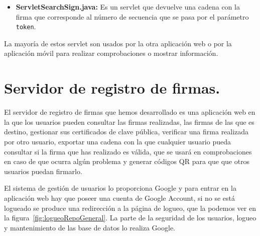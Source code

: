 \begin{itemize}
\begin{lstlisting}[style=Java]
PrintWriter pw = resp.getWriter();
pw.print("<!DOCTYPE html>");
pw.print("<html><head><title>Lista Time Stamp</title><link rel=\"stylesheet\" type=\"text/css\" " + "href=\"css/main.css\"/> <meta charset=\"utf-8\"> </head>");
pw.print("<body><table><tr><th>ID</th><th>Num sec</th><th>Firma</th><th>Date</th></tr><tr> " + "<td>"+ row.getId() +"</td><td>"+ row.getNum_sec() +"</td><td>"+ row.getFirma() +"</td><td>" +	row.getFecha() + "</td></tr> </table></body>");
pw.flush();
\end{lstlisting}

Como se puede ver se crea una tabla en una web, con la etiqueta \lstinline{<TABLE>} y su fila se rellena dinámicamente dependiendo del número de secuencia que se le pase como parámetro.

\item \textbf{ServletSearchSign.java:} Es un servlet que devuelve una cadena con la firma que corresponde al número de secuencia que se pasa por el parámetro \lstinline{token}.

\end{itemize}

La mayoría de estos servlet son usados por la otra aplicación web o por la aplicación móvil para realizar comprobaciones o mostrar información.


\section{Servidor de registro de firmas.}

El servidor de registro de firmas que hemos desarrollado es una aplicación web en la que los usuarios pueden consultar las firmas realizadas, las firmas de las que es destino, gestionar sus certificados de clave pública, verificar una firma realizada por otro usuario, exportar una cadena con la que cualquier usuario pueda consultar si la firma que has realizado es válida, que se usará en comprobaciones en caso de que ocurra algún problema y generar códigos QR para que que otros usuarios puedan firmarlo.

El sistema de gestión de usuarios lo proporciona Google y para entrar en la aplicación web hay que poseer una cuenta de Google Account, si no se está logueado se produce una redirección a la página de logueo, que la podemos ver en la figura~\ref{fig:logueoRepoGeneral}. La parte de la seguridad de los usuarios, logueo y mantenimiento de las base de datos lo realiza Google.

